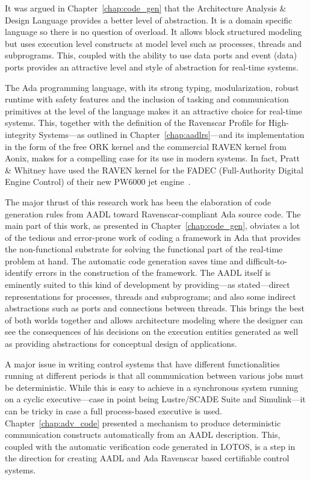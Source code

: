 It was argued in Chapter~\ref{chap:code_gen} that the Architecture
Analysis \& Design Language provides a better level of abstraction. It
is a domain specific language so there is no question of overload. It
allows block structured modeling but uses execution level constructs
at model level such as processes, threads and subprograms. This,
coupled with the ability to use data ports and event (data) ports
provides an attractive level and style of abstraction for real-time
systems.

The Ada programming language, with its strong typing, modularization,
robust runtime with safety features and the inclusion of tasking and
communication primitives at the level of the language makes it an
attractive choice for real-time systems. This, together with the
definition of the Ravenscar Profile for High-integrity Systems---as
outlined in Chapter~\ref{chap:aadlrs}---and its implementation in the
form of the free ORK kernel and the commercial RAVEN kernel from
Aonix, makes for a compelling case for its use in modern systems. In
fact, Pratt \& Whitney have used the RAVEN kernel for the FADEC
(Full-Authority Digital Engine Control) of their new PW6000 jet
engine~\cite{raven-fadec}.

The major thrust of this research work has been the elaboration of
code generation rules from AADL toward Ravenscar-compliant Ada source
code. The main part of this work, as presented in
Chapter~\ref{chap:code_gen}, obviates a lot of the tedious and
error-prone work of coding a framework in Ada that provides the
non-functional substrate for solving the functional part of the
real-time problem at hand. The automatic code generation saves time
and difficult-to-identify errors in the construction of the
framework. The AADL itself is eminently suited to this kind of
development by providing---as stated---direct representations for
processes, threads and subprograms; and also some indirect
abstractions such as ports and connections between threads. This
brings the best of both worlds together and allows architecture
modeling where the designer can see the consequences of his decisions
on the execution entities generated as well as providing abstractions
for conceptual design of applications.

A major issue in writing control systems that have different
functionalities running at different periods is that all communication
between various jobs must be deterministic. While this is easy to
achieve in a synchronous system running on a cyclic executive---case
in point being Lustre/SCADE Suite and Simulink---it can be tricky in
case a full process-based executive is
used. Chapter~\ref{chap:adv_code} presented a mechanism to produce
deterministic communication constructs automatically from an AADL
description. This, coupled with the automatic verification code
generated in LOTOS, is a step in the direction for creating AADL and
Ada Ravenscar based certifiable control systems.

